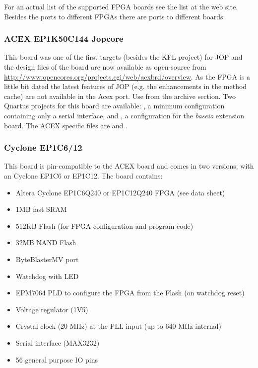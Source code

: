 For an actual list of the supported FPGA boards see the list at the
web site. Besides the ports to different FPGAs there are ports to
different boards.

\subsubsection{ACEX EP1K50C144 Jopcore}

This board was one of the first targets (besides the KFL project)
for JOP and the design files of the board are now available as
open-source from
\url{http://www.opencores.org/projects.cgi/web/acxbrd/overview}. As
the FPGA is a little bit dated the latest features of JOP (e.g. the
enhancements in the method cache) are not available in the Acex
port. Use  from the archive
section. Two Quartus projects for this board are available:
, a minimum configuration containing only a serial
interface, and , a configuration for the \emph{baseio}
extension board. The ACEX specific files are  and
.

\subsubsection{Cyclone EP1C6/12}

This board is pin-compatible to the ACEX board and comes in two
versions: with an Cyclone EP1C6 or EP1C12. The board contains:

\begin{itemize}
    \item Altera Cyclone EP1C6Q240 or EP1C12Q240 FPGA (see data sheet)
    \item 1MB fast SRAM
    \item 512KB Flash (for FPGA configuration and program code)
    \item 32MB NAND Flash
    \item ByteBlasterMV port
    \item Watchdog with LED
    \item EPM7064 PLD to configure the FPGA from the Flash (on watchdog reset)
    \item Voltage regulator (1V5)
    \item Crystal clock (20 MHz) at the PLL input (up to 640 MHz internal)
    \item Serial interface (MAX3232)
    \item 56 general purpose IO pins
\end{itemize}

